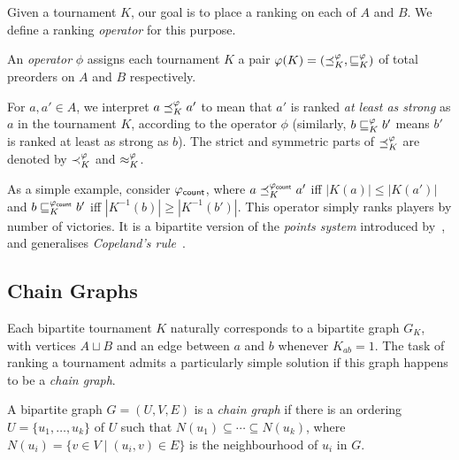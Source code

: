 Given a tournament $K$, our goal is to place a ranking on each of $A$ and $B$. We
define a ranking \emph{operator} for this purpose.

\begin{definition}%

    An \emph{operator} $\phi$ assigns each tournament $K$ a pair $\varphi(K) =
    ({\preceq_K^\varphi}, {\sqsubseteq_K^\varphi})$ of total preorders on $A$ and $B$
    respectively.\footnotemark{}

\end{definition}


For $a, a' \in A$, we interpret $a \preceq_K^\varphi a'$ to mean that $a'$ is ranked
\emph{at least as strong} as $a$ in the tournament $K$, according to the
operator $\phi$ (similarly, $b \sqsubseteq_K^\varphi b'$ means $b'$ is ranked at least as
strong as $b$). The strict and symmetric parts of ${\preceq_K^\varphi}$ are denoted
by ${\prec_K^\varphi}$ and ${\approx_K^\varphi}$.

As a simple example, consider ${\varphi_{\mathsf{count}}}$, where $a \preceq_K^{\varphi_{\mathsf{count}}} a'$ iff
$|K(a)| \le |K(a')|$ and $b \sqsubseteq_K^{\varphi_{\mathsf{count}}} b'$ iff $|K^{-1}(b)| \ge
|K^{-1}(b')|$. This operator simply ranks players by number of victories. It is
a bipartite version of the \emph{points system} introduced
by~\textcite{rubinstein1980ranking}, and generalises \emph{Copeland's
rule}~\cite{brandt2016a}.

\subsection{Chain Graphs}

Each bipartite tournament $K$ naturally corresponds to a bipartite graph $G_K$,
with vertices $A \sqcup B$ and an edge between $a$ and $b$ whenever $K_{ab} =
1$.\footnotemark{} The task of ranking a tournament admits a particularly
simple solution if this graph happens to be a \emph{chain graph}.


\begin{definition}
\label{tourn_def_chain_graph}

    A bipartite graph $G = (U, V, E)$ is a \emph{chain graph} if there is an
    ordering $U = \{u_1,\ldots,u_k\}$ of $U$ such that $N(u_1) \subseteq \cdots
    \subseteq N(u_k)$, where $N(u_i) = \{v \in V \mid (u_i, v) \in E\}$ is the
    neighbourhood of $u_i$ in $G$.

\end{definition}

